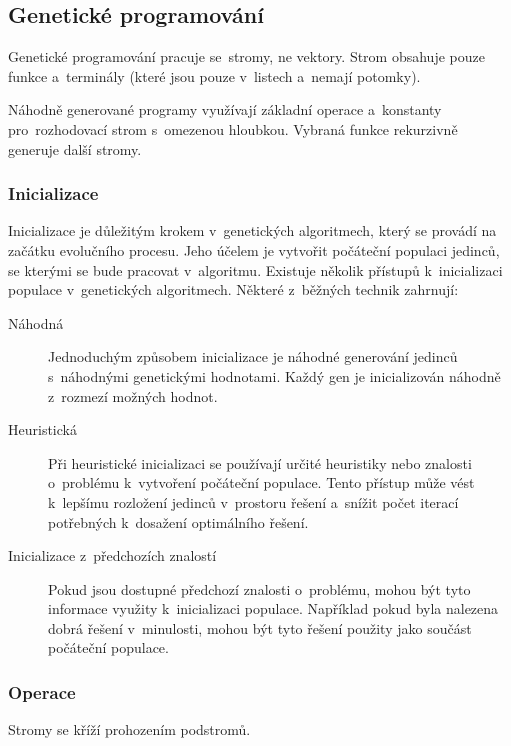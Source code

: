 \subsection{Genetické programování}

Genetické programování pracuje se~stromy, ne vektory.
Strom obsahuje pouze funkce a~terminály (které jsou pouze v~listech a~nemají potomky).

Náhodně generované programy využívají základní operace a~konstanty pro~rozhodovací strom s~omezenou hloubkou.
Vybraná funkce rekurzivně generuje další stromy.

\subsubsection{Inicializace}

Inicializace je důležitým krokem v~genetických algoritmech, který se provádí na začátku evolučního procesu. Jeho účelem je vytvořit počáteční populaci jedinců, se kterými se bude pracovat v~algoritmu.
Existuje několik přístupů k~inicializaci populace v~genetických algoritmech. Některé z~běžných technik zahrnují:

\begin{description}
    \item[Náhodná] Jednoduchým způsobem inicializace je náhodné generování jedinců s~náhodnými genetickými hodnotami. Každý gen je inicializován náhodně z~rozmezí možných hodnot.
    \item[Heuristická] Při heuristické inicializaci se používají určité heuristiky nebo znalosti o~problému k~vytvoření počáteční populace. Tento přístup může vést k~lepšímu rozložení jedinců v~prostoru řešení a~snížit počet iterací potřebných k~dosažení optimálního řešení.
    \item[Inicializace z~předchozích znalostí] Pokud jsou dostupné předchozí znalosti o~problému, mohou být tyto informace využity k~inicializaci populace. Například pokud byla nalezena dobrá řešení v~minulosti, mohou být tyto řešení použity jako součást počáteční populace.
\end{description}

\subsubsection{Operace}

Stromy se kříží prohozením podstromů.

